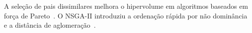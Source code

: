 A seleção de pais dissimilares melhora o hipervolume em algoritmos baseados em força de Pareto~\cite{hollander2023dissimilar}. O NSGA-II introduziu a ordenação rápida por não dominância e a distância de aglomeração~\cite{deb2002fast}.
